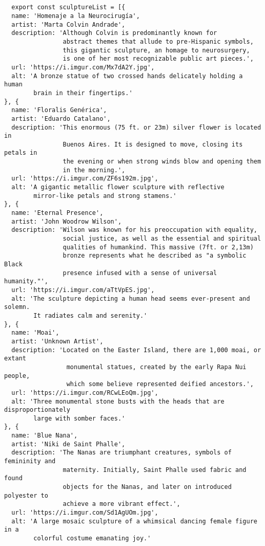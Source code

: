 \begin{verbatim}


  export const sculptureList = [{
  name: 'Homenaje a la Neurocirugía',
  artist: 'Marta Colvin Andrade',
  description: 'Although Colvin is predominantly known for 
                abstract themes that allude to pre-Hispanic symbols, 
                this gigantic sculpture, an homage to neurosurgery, 
                is one of her most recognizable public art pieces.',
  url: 'https://i.imgur.com/Mx7dA2Y.jpg',
  alt: 'A bronze statue of two crossed hands delicately holding a human
        brain in their fingertips.'  
}, {
  name: 'Floralis Genérica',
  artist: 'Eduardo Catalano',
  description: 'This enormous (75 ft. or 23m) silver flower is located in
                Buenos Aires. It is designed to move, closing its petals in 
                the evening or when strong winds blow and opening them 
                in the morning.',
  url: 'https://i.imgur.com/ZF6s192m.jpg',
  alt: 'A gigantic metallic flower sculpture with reflective 
        mirror-like petals and strong stamens.'
}, {
  name: 'Eternal Presence',
  artist: 'John Woodrow Wilson',
  description: 'Wilson was known for his preoccupation with equality, 
                social justice, as well as the essential and spiritual 
                qualities of humankind. This massive (7ft. or 2,13m) 
                bronze represents what he described as "a symbolic Black 
                presence infused with a sense of universal humanity."',
  url: 'https://i.imgur.com/aTtVpES.jpg',
  alt: 'The sculpture depicting a human head seems ever-present and solemn. 
        It radiates calm and serenity.'
}, {
  name: 'Moai',
  artist: 'Unknown Artist',
  description: 'Located on the Easter Island, there are 1,000 moai, or extant
                 monumental statues, created by the early Rapa Nui people, 
                 which some believe represented deified ancestors.',
  url: 'https://i.imgur.com/RCwLEoQm.jpg',
  alt: 'Three monumental stone busts with the heads that are disproportionately 
        large with somber faces.'
}, {
  name: 'Blue Nana',
  artist: 'Niki de Saint Phalle',
  description: 'The Nanas are triumphant creatures, symbols of femininity and 
                maternity. Initially, Saint Phalle used fabric and found 
                objects for the Nanas, and later on introduced polyester to 
                achieve a more vibrant effect.',
  url: 'https://i.imgur.com/Sd1AgUOm.jpg',
  alt: 'A large mosaic sculpture of a whimsical dancing female figure in a 
        colorful costume emanating joy.'

\end{verbatim}
